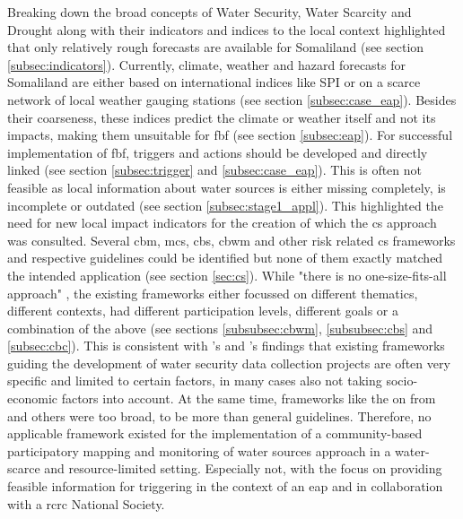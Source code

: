 Breaking down the broad concepts of Water Security, Water Scarcity and Drought along with their indicators and indices to the local context highlighted that only relatively rough forecasts are available for Somaliland (see section \ref{subsec:indicators}). Currently, climate, weather and hazard forecasts for Somaliland are either based on international indices like SPI or on a scarce network of local weather gauging stations (see section \ref*{subsec:case_eap}). Besides their coarseness, these indices predict the climate or weather itself and not its impacts, making them unsuitable for \acrlong{fbf} (see section \ref*{subsec:eap}). For successful implementation of \acrshort{fbf}, triggers and actions should be developed and directly linked (see section \ref{subsec:trigger} and \ref{subsec:case_eap}). This is often not feasible as local information about water sources is either missing completely, is incomplete or outdated (see section \ref{subsec:stage1_appl}). This highlighted the need for new local impact indicators for the creation of which the \acrshort{cs} approach was consulted. Several \acrshort{cbm}, \acrshort{mcs}, \acrshort{cbs}, \acrshort{cbwm} and other risk related \acrshort{cs} frameworks and respective guidelines could be identified but none of them exactly matched the intended application (see section \ref{sec:cs}). While "there is no one-size-fits-all approach" \autocite[2]{fraislCitizenScienceEnvironmental2022}, the existing frameworks either focussed on different thematics, different contexts, had different participation levels, different goals or a combination of the above (see sections \ref{subsubsec:cbwm}, \ref{subsubsec:cbs} and \ref{subsec:cbc}). This is consistent with \autocite{butteFrameworkWaterSecurity2022}'s and \autocite{carrionCROWDSOURCINGWATERQUALITY2020}'s findings that existing frameworks guiding the development of water security data collection projects are often very specific and limited to certain factors, in many cases also not taking socio-economic factors into account. At the same time, frameworks like the on from \autocite{butteFrameworkWaterSecurity2022,eu-citizen.scienceEUCitizenScience,citizenscience.govBasicStepsYour} and others were too broad, to be more than general guidelines. Therefore, no applicable framework existed for the implementation of a community-based participatory mapping and monitoring of water sources approach in a water-scarce and resource-limited setting. Especially not, with the focus on providing feasible information for triggering  in the context of an \acrshort{eap} and in collaboration with a \acrshort{rcrc} National Society.%
